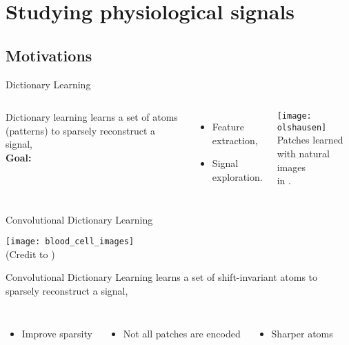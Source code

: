 \documentclass[prez_tpt]{subfiles}
\begin{document}
\section{Studying physiological signals}
\subsection{Motivations}
%
\begin{frame}{Dictionary Learning }
\begin{columns}[c]
        Dictionary learning learns a set of atoms (patterns) to sparsely
        reconstruct a signal,\\[2em]
        \textbf{Goal:}\\[1em]
        \begin{itemize}\itemsep1em
            \item Feature extraction,
            \item Signal exploration.
        \end{itemize}
    \centering
    \texttt{[image: olshausen]}\\[.5em]
    Patches learned with natural images\\ in \citealt{Olshausen1997}.
\end{columns}
\end{frame}

\begin{frame}{Convolutional Dictionary Learning }

{\centering \texttt{[image: blood\_cell\_images]}\\(Credit to \citep{Yellin2017})\\[.5em]}

{\color{red} Convolutional} Dictionary Learning learns a set of {\color{red} shift-invariant} atoms to sparsely reconstruct a signal,
\begin{columns}[T]
    \begin{itemize}
        \item Improve sparsity
    \end{itemize}
    \begin{itemize}
        \item Not all patches are encoded
    \end{itemize}
    \begin{itemize}
        \item Sharper atoms
    \end{itemize}
\end{columns}
\end{frame}
\end{document}
